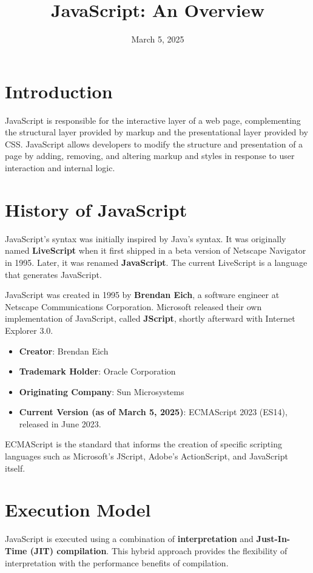 \documentclass[a4paper,12pt]{article}
\title{JavaScript: An Overview}
\author{}
\date{March 5, 2025}
\begin{document}
\maketitle

\section{Introduction}
JavaScript is responsible for the interactive layer of a web page, complementing the structural layer provided by markup and the presentational layer provided by CSS. JavaScript allows developers to modify the structure and presentation of a page by adding, removing, and altering markup and styles in response to user interaction and internal logic.

\section{History of JavaScript}
JavaScript's syntax was initially inspired by Java's syntax. It was originally named \textbf{LiveScript} when it first shipped in a beta version of Netscape Navigator in 1995. Later, it was renamed \textbf{JavaScript}. The current LiveScript is a language that generates JavaScript.

JavaScript was created in 1995 by \textbf{Brendan Eich}, a software engineer at Netscape Communications Corporation. Microsoft released their own implementation of JavaScript, called \textbf{JScript}, shortly afterward with Internet Explorer 3.0.

\begin{itemize}
    \item \textbf{Creator}: Brendan Eich
    \item \textbf{Trademark Holder}: Oracle Corporation
    \item \textbf{Originating Company}: Sun Microsystems
    \item \textbf{Current Version (as of March 5, 2025)}: ECMAScript 2023 (ES14), released in June 2023.
\end{itemize}

ECMAScript is the standard that informs the creation of specific scripting languages such as Microsoft's JScript, Adobe's ActionScript, and JavaScript itself.

\section{Execution Model}
JavaScript is executed using a combination of \textbf{interpretation} and \textbf{Just-In-Time (JIT) compilation}. This hybrid approach provides the flexibility of interpretation with the performance benefits of compilation.
\end{document}
